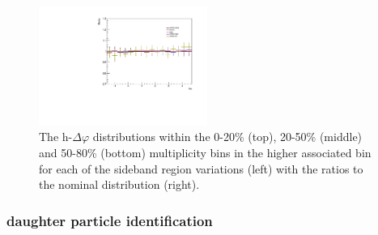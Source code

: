 \begin{figure}[ht]
    \includegraphics[width=0.49\textwidth]{figures/analysis/sideband_variations_dphi_50_80_highpt_ratio.pdf}
    \caption{The h-\lmb $\Delta\varphi$ distributions within the 0-20\% (top), 20-50\% (middle) and 50-80\% (bottom) multiplicity bins in the higher associated \pt bin for each of the sideband region variations (left) with the ratios to the nominal distribution (right).}
    \label{fig:sideband_region_variations_highpt}
\end{figure}

\subsubsection{\lmb daughter particle identification}



